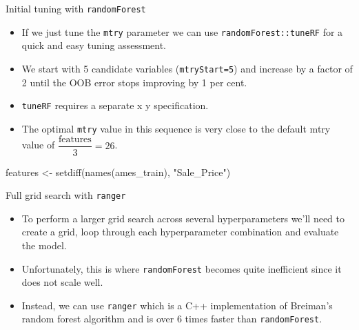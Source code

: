 \documentclass[
  10pt,
  ignorenonframetext,
]{beamer}
\newenvironment{Shaded}{}{}
\newcommand{\DataTypeTok}[1]{#1}
\newcommand{\DecValTok}[1]{#1}
\newcommand{\FloatTok}[1]{#1}
\newcommand{\KeywordTok}[1]{\textcolor[rgb]{0.00,0.00,1.00}{#1}}
\newcommand{\NormalTok}[1]{#1}
\newcommand{\OperatorTok}[1]{#1}
\newcommand{\OtherTok}[1]{\textcolor[rgb]{1.00,0.25,0.00}{#1}}
\newcommand{\StringTok}[1]{\textcolor[rgb]{0.00,0.50,0.50}{#1}}
\providecommand{\tightlist}{%
  \setlength{\itemsep}{0pt}\setlength{\parskip}{0pt}}
\begin{document}
\begin{frame}[fragile]{Initial tuning with \texttt{randomForest}}
\protect\hypertarget{initial-tuning-with-randomforest}{}

\begin{itemize}
\tightlist
\item
  If we just tune the \texttt{mtry} parameter we can use
  \texttt{randomForest::tuneRF} for a quick and easy tuning assessment. 
\item
  We start with 5 candidate variables (\texttt{mtryStart=5}) and
  increase by a factor of 2 until the OOB error stops improving by 1 per
  cent.
\item
  \texttt{tuneRF} requires a separate x y specification.
\item
  The optimal \texttt{mtry} value in this sequence is very close to the
  default mtry value of \(\dfrac{\text{features}}{3}=26\).
\end{itemize}

\begin{Shaded}
\begin{Highlighting}[]
\NormalTok{features <-}\StringTok{ }\KeywordTok{setdiff}\NormalTok{(}\KeywordTok{names}\NormalTok{(ames_train), }\StringTok{"Sale_Price"}\NormalTok{)}
\end{Highlighting}
\end{Shaded}

\begin{Shaded}
\end{Shaded}

\end{frame}

\begin{frame}[fragile]{Full grid search with \texttt{ranger}}
\protect\hypertarget{full-grid-search-with-ranger}{}

\begin{itemize}
\tightlist
\item
  To perform a larger grid search across several hyperparameters we'll
  need to create a grid, loop through each hyperparameter combination
  and evaluate the model.
\item
  Unfortunately, this is where \texttt{randomForest} becomes quite
  inefficient since it does not scale well.
\item
  Instead, we can use \texttt{ranger} which is a C++ implementation of
  Breiman's random forest algorithm and is over 6 times faster than
  \texttt{randomForest}.
\end{itemize}

\end{frame}
\end{document}
